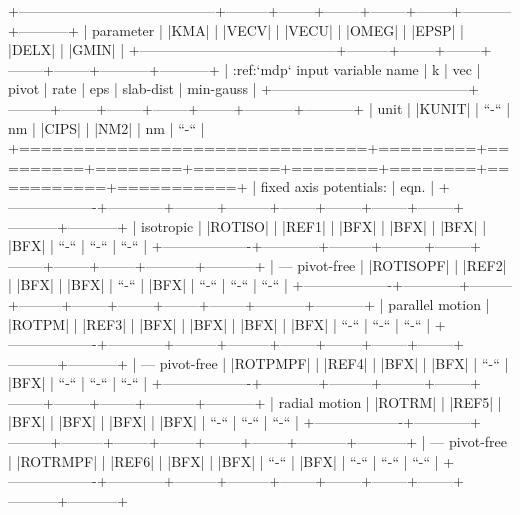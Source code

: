            +------------------------------------------+---------+--------+--------+--------+--------+-----------+-----------+
           | parameter                                | |KMA|   | |VECV| | |VECU| | |OMEG| | |EPSP| | |DELX|    | |GMIN|    |
           +------------------------------------------+---------+--------+--------+--------+--------+-----------+-----------+
           | :ref:`mdp` input variable name           | k       | vec    | pivot  | rate   | eps    | slab-dist | min-gauss |
           +------------------------------------------+---------+--------+--------+--------+--------+-----------+-----------+
           | unit                                     | |KUNIT| | ``-``  | nm     | |CIPS| | |NM2|  | nm        | ``-``     |
           +================================+=========+=========+========+========+========+========+===========+===========+
           | fixed axis potentials:         | eqn.                                                                          |
           +-------------------+------------+---------+---------+--------+--------+--------+--------+-----------+-----------+
           | isotropic         | |ROTISO|   | |REF1|  | |BFX|   | |BFX|  | |BFX|  | |BFX|  | ``-``  | ``-``     | ``-``     |
           +-------------------+------------+---------+---------+--------+--------+--------+--------+-----------+-----------+
           | --- pivot-free    | |ROTISOPF| | |REF2|  | |BFX|   | |BFX|  | ``-``  | |BFX|  | ``-``  | ``-``     | ``-``     |
           +-------------------+------------+---------+---------+--------+--------+--------+--------+-----------+-----------+
           | parallel motion   | |ROTPM|    | |REF3|  | |BFX|   | |BFX|  | |BFX|  | |BFX|  | ``-``  | ``-``     | ``-``     |
           +-------------------+------------+---------+---------+--------+--------+--------+--------+-----------+-----------+
           | --- pivot-free    | |ROTPMPF|  | |REF4|  | |BFX|   | |BFX|  | ``-``  | |BFX|  | ``-``  | ``-``     | ``-``     |
           +-------------------+------------+---------+---------+--------+--------+--------+--------+-----------+-----------+
           | radial motion     | |ROTRM|    | |REF5|  | |BFX|   | |BFX|  | |BFX|  | |BFX|  | ``-``  | ``-``     | ``-``     |
           +-------------------+------------+---------+---------+--------+--------+--------+--------+-----------+-----------+
           | --- pivot-free    | |ROTRMPF|  | |REF6|  | |BFX|   | |BFX|  | ``-``  | |BFX|  | ``-``  | ``-``     | ``-``     |
           +-------------------+------------+---------+---------+--------+--------+--------+--------+-----------+-----------+
